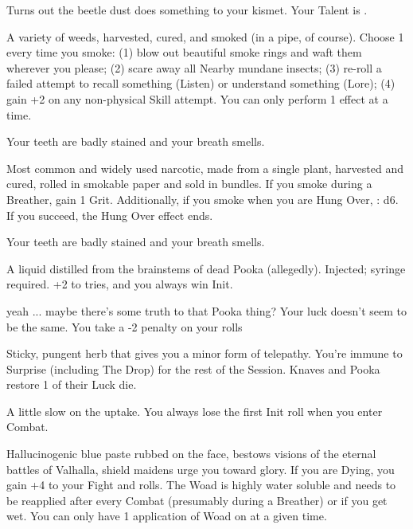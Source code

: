 {\begin{multicols}{2}
    Turns out the beetle dust does something to your kismet.   Your \MAX Talent is \DCDOWN.



  A variety of weeds, harvested, cured, and smoked (in a pipe, of course). Choose 1 every time you smoke: (1) blow out beautiful smoke rings and waft them wherever you please; (2) scare away all Nearby mundane insects; (3) re-roll a failed attempt to recall something (Listen) or understand something (Lore); (4) gain +2 on any non-physical Skill \RO attempt.  You can only perform 1 effect at a time.  

     Your teeth are badly stained and your breath smells.



  Most common and widely used narcotic, made from a single plant, harvested and cured, rolled in smokable paper and sold in bundles.  If you smoke during a Breather, gain 1 Grit.  Additionally, if you smoke when you are Hung Over, \RS : d6.  If you succeed, the Hung Over effect ends.

    Your teeth are badly stained and your breath smells.  


  A liquid distilled from the brainstems of dead Pooka (allegedly).  Injected; syringe required. +2 to \DEX tries, and you always win Init.

    yeah ... maybe there's some truth to that Pooka thing?  Your luck doesn't seem to be the same.  You take a -2 penalty on your \DEATH rolls


  Sticky, pungent herb that gives you a minor form of telepathy.  You're immune to Surprise (including The Drop) for the rest of the Session.  Knaves and Pooka restore 1 \UD of their Luck die.

    A little slow on the uptake.  You always lose the first Init roll when you enter Combat.



  Hallucinogenic blue paste rubbed on the face, bestows visions of the eternal battles of Valhalla, shield maidens urge you toward glory.  If you are Dying, you gain +4 to your Fight \RO and \DEATH rolls. The Woad is highly water soluble and needs to be reapplied after every Combat (presumably during a Breather) or if you get wet.  You can only have 1 application of Woad on at a given time.


\end{multicols}}
